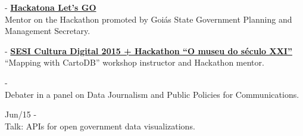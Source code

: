 \documentclass[]{friggeri-cv}
\begin{document}
{\footnotesize{}} - \href{http://www.lets.go.gov.br/}{\textbf{Hackatona Let's GO}}\\
           {Mentor on the Hackathon promoted by Goiás State Government Planning and Management Secretary}.

{\footnotesize{}} - \href{http://www.hackagenda.com.br/evento/sesi-cultura-digital-2015-hackathon-o-museu-do-seculo-xxi/}{\textbf{SESI Cultura Digital 2015 + Hackathon “O museu do século XXI”}}\\
           {``Mapping with CartoDB'' workshop instructor and Hackathon mentor}.


{\footnotesize{}} - \href{https://portaldoaluno.casperlibero.edu.br/agenda-eventos/semana-de-jornalismo-casper-libero-2/}{\textbf{}}\\
           {Debater in a panel on Data Journalism and Public Policies for Communications}.

{\footnotesize{Jun/15}} - \href{https://setemasters.imasters.com.br/edicoes/design-de-apis/}{}\\
%
           {Talk: APIs for open government data visualizations}.
\end{document}
